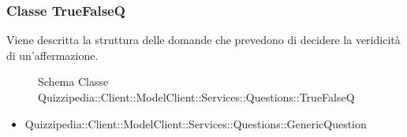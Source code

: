 \subsubsection{Classe TrueFalseQ}
Viene descritta la struttura delle domande che prevedono di decidere la veridicità di un'affermazione.
\begin{figure}[H]
\centering
\noindent{}
\caption[Schema Classe TrueFalseQ]{Schema Classe Quizzipedia::Client::ModelClient::Services::Questions::TrueFalseQ}
\end{figure}
\begin{itemize}
\item Quizzipedia::Client::ModelClient::Services::Questions::GenericQuestion
\end{itemize}
